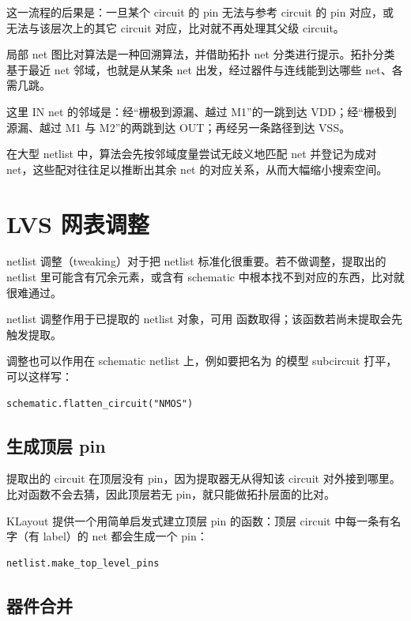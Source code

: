 这一流程的后果是：一旦某个 circuit 的 pin 无法与参考 circuit 的 pin 对应，或无法与该层次上的其它 circuit 对应，比对就不再处理其父级 circuit。

局部 net 图比对算法是一种回溯算法，并借助拓扑 net 分类进行提示。拓扑分类基于最近 net 邻域，也就是从某条 net 出发，经过器件与连线能到达哪些 net、各需几跳。


这里 IN net 的邻域是：经“栅极到源漏、越过 M1”的一跳到达 VDD；经“栅极到源漏、越过 M1 与 M2”的两跳到达 OUT；再经另一条路径到达 VSS。

在大型 netlist 中，算法会先按邻域度量尝试无歧义地匹配 net 并登记为成对 net，这些配对往往足以推断出其余 net 的对应关系，从而大幅缩小搜索空间。

\section{LVS 网表调整}\label{sec:lvs_tweaks}

netlist 调整（tweaking）对于把 netlist 标准化很重要。若不做调整，提取出的 netlist 里可能含有冗余元素，或含有 schematic 中根本找不到对应的东西，比对就很难通过。

netlist 调整作用于已提取的 netlist 对象，可用  函数取得；该函数若尚未提取会先触发提取。

调整也可以作用在 schematic netlist 上，例如要把名为  的模型 subcircuit 打平，可以这样写：

\begin{lstlisting}
schematic.flatten_circuit("NMOS")
\end{lstlisting}

\subsection{生成顶层 pin}

提取出的 circuit 在顶层没有 pin，因为提取器无从得知该 circuit 对外接到哪里。比对函数不会去猜，因此顶层若无 pin，就只能做拓扑层面的比对。

KLayout 提供一个用简单启发式建立顶层 pin 的函数：顶层 circuit 中每一条有名字（有 label）的 net 都会生成一个 pin：

\begin{lstlisting}
netlist.make_top_level_pins
\end{lstlisting}

\subsection{器件合并}

